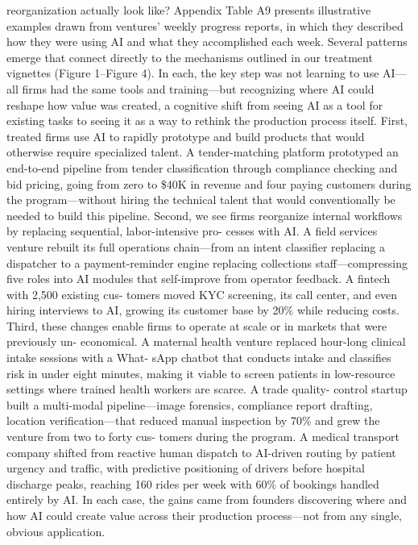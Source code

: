reorganization actually look like? Appendix Table A9 presents illustrative examples drawn from
ventures’ weekly progress reports, in which they described how they were using AI and what they
accomplished each week. Several patterns emerge that connect directly to the mechanisms outlined
in our treatment vignettes (Figure 1–Figure 4). In each, the key step was not learning to use AI—
all firms had the same tools and training—but recognizing where AI could reshape how value was
created, a cognitive shift from seeing AI as a tool for existing tasks to seeing it as a way to rethink
the production process itself.
First, treated firms use AI to rapidly prototype and build products that would otherwise require
specialized talent.
A tender-matching platform prototyped an end-to-end pipeline from tender
classification through compliance checking and bid pricing, going from zero to \$40K in revenue
and four paying customers during the program—without hiring the technical talent that would
conventionally be needed to build this pipeline.
Second, we see firms reorganize internal workflows by replacing sequential, labor-intensive pro-
cesses with AI. A field services venture rebuilt its full operations chain—from an intent classifier
replacing a dispatcher to a payment-reminder engine replacing collections staff—compressing five
roles into AI modules that self-improve from operator feedback. A fintech with 2,500 existing cus-
tomers moved KYC screening, its call center, and even hiring interviews to AI, growing its customer
base by 20\% while reducing costs.
Third, these changes enable firms to operate at scale or in markets that were previously un-
economical. A maternal health venture replaced hour-long clinical intake sessions with a What-
sApp chatbot that conducts intake and classifies risk in under eight minutes, making it viable to
screen patients in low-resource settings where trained health workers are scarce. A trade quality-
control startup built a multi-modal pipeline—image forensics, compliance report drafting, location
verification—that reduced manual inspection by 70\% and grew the venture from two to forty cus-
tomers during the program. A medical transport company shifted from reactive human dispatch
to AI-driven routing by patient urgency and traffic, with predictive positioning of drivers before
hospital discharge peaks, reaching 160 rides per week with 60\% of bookings handled entirely by AI.
In each case, the gains came from founders discovering where and how AI could create value across
their production process—not from any single, obvious application.
